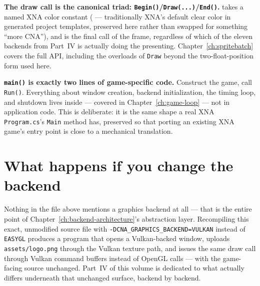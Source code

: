 \textbf{The draw call is the canonical  triad:
\texttt{Begin()}/\texttt{Draw(...)}/\texttt{End()}.}  takes a
named XNA color constant ( --- traditionally XNA's default
clear color in generated project templates, preserved here rather than swapped for something
``more CNA''), and  is the final call of the frame,
regardless of which of the eleven backends from Part~IV is actually doing the presenting.
Chapter~\ref{ch:spritebatch} covers the full  API, including the
overloads of \texttt{Draw} beyond the two-float-position form used here.

\textbf{\texttt{main()} is exactly two lines of game-specific code.} Construct the game,
call \texttt{Run()}. Everything about window creation, backend initialization, the timing
loop, and shutdown lives inside  --- covered in
Chapter~\ref{ch:game-loop} --- not in application code. This is deliberate: it is the same
shape a real XNA \texttt{Program.cs}'s \texttt{Main} method has, preserved so that porting an
existing XNA game's entry point is close to a mechanical translation.

\section{What happens if you change the backend}

Nothing in the file above mentions a graphics backend at all --- that is the entire point of
Chapter~\ref{ch:backend-architecture}'s abstraction layer. Recompiling this exact,
unmodified source file with \texttt{-DCNA\_GRAPHICS\_BACKEND=VULKAN} instead of
\texttt{EASYGL} produces a program that opens a Vulkan-backed window, uploads
\texttt{assets/logo.png} through the Vulkan texture path, and issues the same
 draw call through Vulkan command buffers instead of OpenGL calls ---
with the game-facing source unchanged. Part~IV of this volume is dedicated to what actually
differs underneath that unchanged surface, backend by backend.
